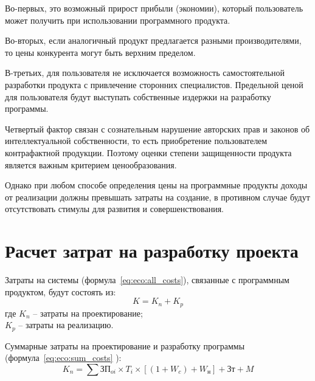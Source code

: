 \documentclass[utf8,usehyperref,12pt]{G7-32}
\begin{document}
Во-первых, это возможный прирост прибыли (экономии), который пользователь может получить при использовании программного продукта. 

Во-вторых, если аналогичный продукт предлагается разными производителями, то цены конкурента могут быть верхним пределом. 

В-третьих, для пользователя не исключается возможность самостоятельной разработки продукта с привлечение сторонних специалистов. Предельной ценой для пользователя будут выступать собственные издержки на разработку программы.

Четвертый фактор связан с сознательным нарушение авторских прав и законов об интеллектуальной собственности, то есть приобретение пользователем контрафактной продукции. Поэтому оценки степени защищенности продукта является важным критерием ценообразования.

Однако при любом способе определения цены на программные продукты доходы от реализации должны превышать затраты на создание, в противном случае будут отсутствовать стимулы для развития и совершенствования.

\section{Расчет затрат на разработку проекта}
Затраты на системы (формула~\ref{eq:eco:all_costs}), связанные с программным продуктом, будут состоять из:
\begin{equation}
  \label{eq:eco:all_costs}
  K = K_n + K_p
\end{equation}
где $K_n$ -- затраты на проектирование;\\$K_p$ -- затраты на реализацию.

Суммарные затраты на проектирование  и разработку программы (формула~\ref{eq:eco:sum_costs} ):
\begin{equation}
  \label{eq:eco:sum_costs}
  K_n = \sum ЗП_{oi} \times T_{i} \times [(1 + W_c) + W_н] + Зт + M
\end{equation}
\end{document}
